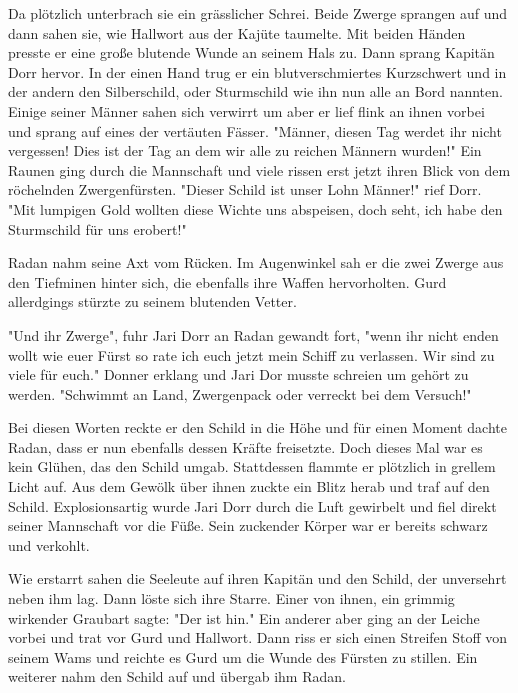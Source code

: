 \documentclass[10pt, a4paper, oneside]{book}
\begin{document}
\begin{multicols}{2}
Da plötzlich unterbrach sie ein grässlicher Schrei. Beide Zwerge sprangen auf und dann sahen sie, wie Hallwort aus der Kajüte taumelte. Mit beiden Händen presste er eine große blutende Wunde an seinem Hals zu. Dann sprang Kapitän Dorr hervor. In der einen Hand trug er ein blutverschmiertes Kurzschwert und in der andern den Silberschild, oder Sturmschild wie ihn nun alle an Bord nannten. Einige seiner Männer sahen sich verwirrt um aber er lief flink an ihnen vorbei und sprang auf eines der vertäuten Fässer. "Männer, diesen Tag werdet ihr nicht vergessen! Dies ist der Tag an dem wir alle zu reichen Männern wurden!" Ein Raunen ging durch die Mannschaft und viele rissen erst jetzt ihren Blick von dem röchelnden Zwergenfürsten. "Dieser Schild ist unser Lohn Männer!" rief Dorr. "Mit lumpigen Gold wollten diese Wichte uns abspeisen, doch seht, ich habe den Sturmschild für uns erobert!"\bigskip

Radan nahm seine Axt vom Rücken. Im Augenwinkel sah er die zwei Zwerge aus den Tiefminen hinter sich, die ebenfalls ihre Waffen hervorholten. Gurd allerdgings stürzte zu seinem blutenden Vetter.\bigskip

"Und ihr Zwerge", fuhr Jari Dorr an Radan gewandt fort, "wenn ihr nicht enden wollt wie euer Fürst so rate ich euch jetzt mein Schiff zu verlassen. Wir sind zu viele für euch." Donner erklang und Jari Dor musste schreien um gehört zu werden.  "Schwimmt an Land, Zwergenpack oder verreckt bei dem Versuch!"\bigskip

Bei diesen Worten reckte er den Schild in die Höhe und für einen Moment dachte Radan, dass er nun ebenfalls dessen Kräfte freisetzte. Doch dieses Mal war es kein Glühen, das den Schild umgab. Stattdessen flammte er plötzlich in grellem Licht auf. Aus dem Gewölk über ihnen zuckte ein Blitz herab und traf auf den Schild. Explosionsartig wurde Jari Dorr durch die Luft gewirbelt und fiel direkt seiner Mannschaft vor die Füße. Sein zuckender Körper war er bereits schwarz und verkohlt.\bigskip

Wie erstarrt sahen die Seeleute auf ihren Kapitän und den Schild, der unversehrt neben ihm lag. Dann löste sich ihre Starre. Einer von ihnen, ein grimmig wirkender Graubart sagte: "Der ist hin." Ein anderer aber ging an der Leiche vorbei und trat vor Gurd und Hallwort. Dann riss er sich einen Streifen Stoff von seinem Wams und reichte es Gurd um die Wunde des Fürsten zu stillen. Ein weiterer nahm den Schild auf und übergab ihm Radan.\bigskip


\end{multicols}
\end{document}
